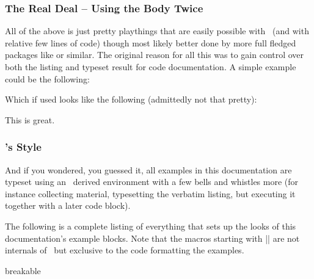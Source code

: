 \subsubsection{The Real Deal -- Using the Body Twice}
All of the above is just pretty playthings that are easily possible with
\envlogo\ (and with relative few lines of code) though most likely better done
by more full fledged packages like  or similar. The original
reason for all this was to gain control over both the listing and typeset result
for code documentation. A simple example could be the following:
\begin{ex}
  \newenvironment{myenv}
    {\enverb{}}
    {%
      \par\noindent
      \begin{minipage}{0.48\linewidth}
        \enverbListing{lstlisting}{}
      \end{minipage}%
      \hfill
      \colorbox{yellow}
        {%
          \begin{minipage}{\dimexpr0.48\linewidth-2\fboxsep\relax}
            \enverbExecute
          \end{minipage}%
        }%
      \par
    }
\end{ex}
Which if used looks like the following (admittedly not that pretty):
\begin{ex}[restore]
  \begin{myenv}
    This%
    is%
    great.%
  \end{myenv}
\end{ex}

\subsubsection{\envlogo's Style}
And if you wondered, you guessed it, all examples in this documentation are
typeset using an \envlogo\ derived environment with a few bells and whistles
more (for instance collecting material, typesetting the verbatim listing, but
executing it together with a later code block).

The following is a complete listing of everything that sets up the looks of this
documentation's example blocks. Note that the macros starting with |\enverb@ex@|
are not internals of \envlogo\ but exclusive to the code formatting the
examples.
\begin{exwrap}{breakable}
  \footnotesize
  
\end{exwrap}

